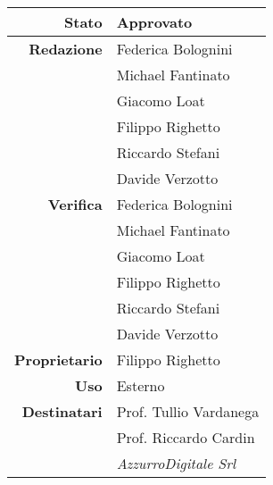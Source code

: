 \thispagestyle{empty} %

\begin{center}
\begin{tabular}{r|l}
    \textbf{Stato} & Approvato \\
    \hline
    \textbf{Redazione} & Federica Bolognini \\
                       & Michael Fantinato \\
                       & Giacomo Loat \\
                       & Filippo Righetto \\
                       & Riccardo Stefani \\
                       & Davide Verzotto \\
    \hline
    \textbf{Verifica} & Federica Bolognini \\
                      & Michael Fantinato \\
                      & Giacomo Loat \\
                      & Filippo Righetto \\
                      & Riccardo Stefani \\
                      & Davide Verzotto \\
    \hline
    \textbf{Proprietario} & Filippo Righetto \\
    \hline
    \textbf{Uso} & Esterno \\
    \hline
    \textbf{Destinatari} & Prof. Tullio Vardanega \\
                         & Prof. Riccardo Cardin \\
                         & \emph{AzzurroDigitale Srl} \\
\end{tabular}
\end{center}
    

